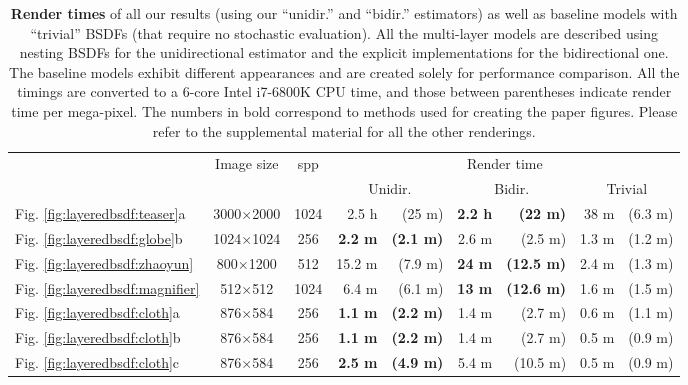 \begin{table}[h]
	\centering
	\caption[Render times of all our results]{\label{tab:layeredbsdf:performance}
		\textbf{Render times} of all our results (using our ``unidir.'' and ``bidir.'' estimators) as well as baseline models with ``trivial'' BSDFs (that require no stochastic evaluation).
		All the multi-layer models are described using nesting BSDFs for the unidirectional estimator and the explicit implementations for the bidirectional one.
		The baseline models exhibit different appearances and are created solely for performance comparison.
		All the timings are converted to a 6-core Intel i7-6800K CPU time, and those between parentheses indicate render time per mega-pixel.
		The numbers in bold correspond to methods used for creating the paper figures.
		Please refer to the supplemental material for all the other renderings.
	}
   	\addtolength{\tabcolsep}{0pt} 
	\begin{tabular}{l|c|c|rr|rr|rr}
	& \multirow{2}{*}{Image size}  & \multirow{2}{*}{spp} & \multicolumn{6}{c}{Render time}\\
	& & & \multicolumn{2}{c}{Unidir.} & \multicolumn{2}{c}{Bidir.} & \multicolumn{2}{c}{Trivial}\\
	\hline
	Fig. \ref{fig:layeredbsdf:teaser}a 			& 3000$\times$2000 & 1024 & 2.5 h  		   	& (25 m) 			& \textbf{2.2 h}& \textbf{(22 m)}   & 38 m  & (6.3 m)\\
	Fig. \ref{fig:layeredbsdf:globe}b 			& 1024$\times$1024 & 256  & \textbf{2.2 m} 	& \textbf{(2.1 m)} 	& 2.6 m 		& (2.5 m)   		& 1.3 m & (1.2 m)\\
	Fig. \ref{fig:layeredbsdf:zhaoyun} 			& 800$\times$1200  & 512  & 15.2 m   	   	& (7.9 m)		 	& \textbf{24 m} & \textbf{(12.5 m)} & 2.4 m & (1.3 m)\\
	Fig. \ref{fig:layeredbsdf:magnifier} 		& 512$\times$512   & 1024 & 6.4 m 			& (6.1 m) 			& \textbf{13 m} & \textbf{(12.6 m)} & 1.6 m & (1.5 m)\\
	Fig. \ref{fig:layeredbsdf:cloth}a 			& 876$\times$584   & 256  & \textbf{1.1 m} 	& \textbf{(2.2 m)} 	& 1.4 m 		& (2.7 m)   		& 0.6 m & (1.1 m)\\
	Fig. \ref{fig:layeredbsdf:cloth}b 			& 876$\times$584   & 256  & \textbf{1.1 m} 	& \textbf{(2.2 m)} 	& 1.4 m 		& (2.7 m)		   	& 0.5 m & (0.9 m)\\
	Fig. \ref{fig:layeredbsdf:cloth}c 			& 876$\times$584   & 256  & \textbf{2.5 m} 	& \textbf{(4.9 m)}	& 5.4 m 		& (10.5 m)  		& 0.5 m & (0.9 m)\\

\end{tabular}
\end{table}
